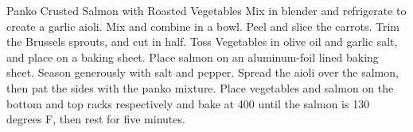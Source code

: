 \documentclass[]{article}
\title{}
\author{}
\begin{document}
\begin{recipe}{Panko Crusted Salmon with Roasted Vegetables}{}{}
	Mix in blender and refrigerate to create a garlic aioli.
	Mix and combine in a bowl. 
	Peel and slice the carrots.
	Trim the Brussels sprouts, and cut in half. Toss Vegetables in olive oil and garlic salt, and place on a baking sheet.
	Place salmon on an aluminum-foil lined baking sheet. Season generously with salt and pepper. Spread the aioli over the salmon, then pat the sides with the panko mixture.
	\ingredient[]{}{}
	Place vegetables and salmon on the bottom and top racks respectively and bake at 400 until the salmon is 130 degrees F, then rest for five minutes. 
\end{recipe}
\end{document}
